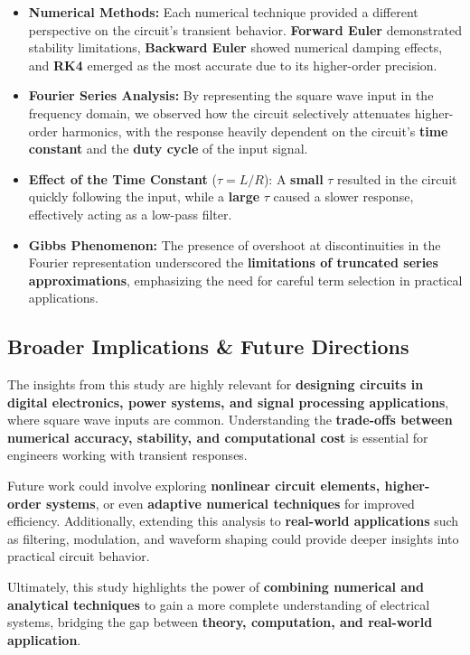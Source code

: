\documentclass[12pt,a4paper]{report}
\begin{document}
\begin{itemize}
    \item \textbf{Numerical Methods:} Each numerical technique provided a different perspective on the circuit's transient behavior. \textbf{Forward Euler} demonstrated stability limitations, \textbf{Backward Euler} showed numerical damping effects, and \textbf{RK4} emerged as the most accurate due to its higher-order precision.
    
    \item \textbf{Fourier Series Analysis:} By representing the square wave input in the frequency domain, we observed how the circuit selectively attenuates higher-order harmonics, with the response heavily dependent on the circuit’s \textbf{time constant} and the \textbf{duty cycle} of the input signal.
    
    \item \textbf{Effect of the Time Constant} (\( \tau = L/R \)): A \textbf{small} \( \tau \) resulted in the circuit quickly following the input, while a \textbf{large} \( \tau \) caused a slower response, effectively acting as a low-pass filter.
    
    \item \textbf{Gibbs Phenomenon:} The presence of overshoot at discontinuities in the Fourier representation underscored the \textbf{limitations of truncated series approximations}, emphasizing the need for careful term selection in practical applications.
\end{itemize}

\subsection{Broader Implications \& Future Directions}

The insights from this study are highly relevant for \textbf{designing circuits in digital electronics, power systems, and signal processing applications}, where square wave inputs are common. Understanding the \textbf{trade-offs between numerical accuracy, stability, and computational cost} is essential for engineers working with transient responses.

Future work could involve exploring \textbf{nonlinear circuit elements, higher-order systems}, or even \textbf{adaptive numerical techniques} for improved efficiency. Additionally, extending this analysis to \textbf{real-world applications} such as filtering, modulation, and waveform shaping could provide deeper insights into practical circuit behavior.

Ultimately, this study highlights the power of \textbf{combining numerical and analytical techniques} to gain a more complete understanding of electrical systems, bridging the gap between \textbf{theory, computation, and real-world application}.
\end{document}
